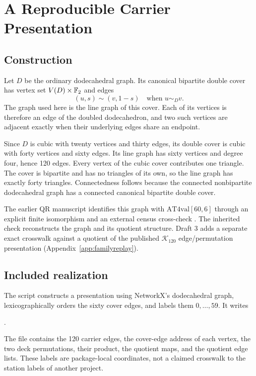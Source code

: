 \section{A Reproducible Carrier Presentation}
\label{app:carrier}
\subsection{Construction}
Let $D$ be the ordinary dodecahedral graph. Its canonical bipartite double cover has vertex set $V(D)\times\mathbb F_2$ and edges
\[
(u,s)\sim(v,1-s)\quad\text{when }u\sim_Dv.
\]
The graph used here is the line graph of this cover. Each of its vertices is therefore an edge of the doubled dodecahedron, and two such vertices are adjacent exactly when their underlying edges share an endpoint.

Since $D$ is cubic with twenty vertices and thirty edges, its double cover is cubic with forty vertices and sixty edges. Its line graph has sixty vertices and degree four, hence 120 edges. Every vertex of the cubic cover contributes one triangle. The cover is bipartite and has no triangles of its own, so the line graph has exactly forty triangles. Connectedness follows because the connected nonbipartite dodecahedral graph has a connected canonical bipartite double cover.

The earlier QR manuscript identifies this graph with $\mathrm{AT4val}[60,6]$ through an explicit finite isomorphism and an external census cross-check \cite{cave2026becoming,psv2013}. The inherited check reconstructs the graph and its quotient structure. Draft 3 adds a separate exact crosswalk against a quotient of the published $\mathcal K_{120}$ edge/permutation presentation (Appendix~\ref{app:familyreplay}).

\subsection{Included realization}
The script  constructs a presentation using NetworkX's dodecahedral graph, lexicographically orders the sixty cover edges, and labels them $0,\ldots,59$. It writes
\begin{center}
.
\end{center}
The file contains the 120 carrier edges, the cover-edge address of each vertex, the two deck permutations, their product, the quotient maps, and the quotient edge lists. These labels are package-local coordinates, not a claimed crosswalk to the station labels of another project.

